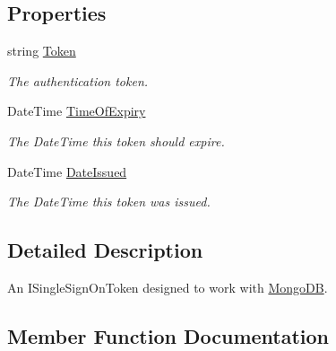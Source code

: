 \subsection*{Properties}
\begin{DoxyCompactItemize}
\item 
string \hyperlink{classCqrs_1_1MongoDB_1_1Repositories_1_1Authentication_1_1SingleSignOnToken_abf59456bf30dd139620ed6de3ee11e74_abf59456bf30dd139620ed6de3ee11e74}{Token}
\begin{DoxyCompactList}\small\item\em The authentication token. \end{DoxyCompactList}\item 
Date\+Time \hyperlink{classCqrs_1_1MongoDB_1_1Repositories_1_1Authentication_1_1SingleSignOnToken_ab91868f3fc18e2369131ab931e04cacc_ab91868f3fc18e2369131ab931e04cacc}{Time\+Of\+Expiry}
\begin{DoxyCompactList}\small\item\em The Date\+Time this token should expire. \end{DoxyCompactList}\item 
Date\+Time \hyperlink{classCqrs_1_1MongoDB_1_1Repositories_1_1Authentication_1_1SingleSignOnToken_acf0a5524d873b709b3955374ec6cc76d_acf0a5524d873b709b3955374ec6cc76d}{Date\+Issued}
\begin{DoxyCompactList}\small\item\em The Date\+Time this token was issued. \end{DoxyCompactList}\end{DoxyCompactItemize}


\subsection{Detailed Description}
An I\+Single\+Sign\+On\+Token designed to work with \hyperlink{namespaceCqrs_1_1MongoDB}{Mongo\+DB}. 



\subsection{Member Function Documentation}
\mbox{\label{classCqrs_1_1MongoDB_1_1Repositories_1_1Authentication_1_1SingleSignOnToken_a2392ecdb53f1f2a38a67d80a77f11ba4_a2392ecdb53f1f2a38a67d80a77f11ba4}} 
